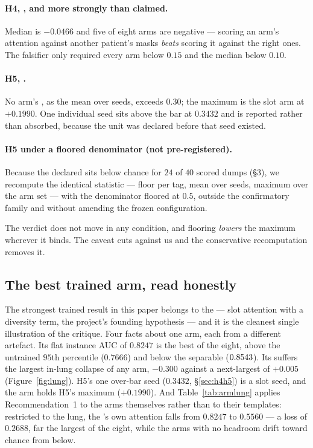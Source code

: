 \documentclass[10pt]{article}
\begin{document}
\paragraph{H4, \PASS{}, and more strongly than claimed.} Median \pss{} is
$-0.0466$ and five of eight arms are negative --- scoring an arm's attention
against another patient's masks \emph{beats} scoring it against the right ones.
The falsifier only required every arm below $0.15$ and the median below $0.10$.

\paragraph{H5, \PASS{}.} No arm's \pns{}, as the mean over seeds, exceeds
$0.30$; the maximum is the slot arm at $+0.1990$. One individual seed sits above
the bar at $0.3432$ and is reported rather than absorbed, because the unit was
declared before that seed existed.

\paragraph{H5 under a floored denominator (not pre-registered).} Because the
declared \attden{} sits below chance for $24$ of $40$ scored dumps
(\S3), we recompute the identical statistic --- floor per tag, mean over seeds,
maximum over the arm set --- with the denominator floored at $0.5$, outside the
confirmatory family and without amending the frozen configuration.

\begin{center}

\end{center}

\noindent The verdict does not move in any condition, and flooring \emph{lowers}
the maximum wherever it binds. The caveat cuts against us and the conservative
recomputation removes it.

\subsection{The best trained arm, read honestly}
\label{sec:slot}

The strongest trained result in this paper belongs to the \armSlot{} --- slot
attention with a diversity term, the project's founding hypothesis --- and it
is the cleanest single illustration of the critique. Four facts about one
arm, each from a different artefact. Its flat instance AUC of $0.8247$ is the
best of the eight, above the untrained $95$th percentile ($0.7666$) and below
the separable \maskref{} ($0.8543$). Its \attden{} suffers the largest
in-lung collapse of any arm, $-0.300$ against a next-largest of $+0.005$
(Figure~\ref{fig:lung}). H5's one over-bar seed ($0.3432$,
\S\ref{sec:h4h5}) is a slot seed, and the arm holds H5's maximum
($+0.1990$). And Table~\ref{tab:armlung} applies Recommendation~1 to the arms
themselves rather than to their templates: restricted to the lung, the
\armSlot{}'s own attention falls from $0.8247$ to $0.5560$ --- a loss of
$0.2688$, far the largest of the eight, while the arms with no headroom drift
toward chance from below.
\end{document}
